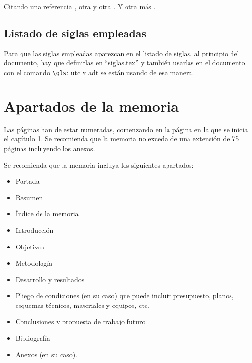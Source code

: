 Citando una referencia \cite{Smith1997}, otra \cite{Orfanidis1996} y otra \cite{Wyndrum1965}. Y otra más \cite{Dai2010}.

\section{Listado de siglas empleadas}

Para que las siglas empleadas aparezcan en el listado de siglas, al principio del documento, hay que definirlas en ``siglas.tex'' y también usarlas en el documento con el comando \verb+\gls+: \gls{utc} y \gls{adt} se están usando de esa manera.


\chapter{Apartados de la memoria}

Las páginas han de estar numeradas, comenzando en la página en la que se inicia el capítulo 1. Se recomienda que la memoria no exceda de una extensión de 75 páginas incluyendo los anexos.

Se recomienda que la memoria incluya los siguientes apartados:
\begin{itemize}
\item Portada
\item Resumen
\item Índice de la memoria
\item Introducción
\item Objetivos
\item Metodología
\item Desarrollo y resultados
\item Pliego de condiciones (en su caso) que puede incluir presupuesto, planos, esquemas técnicos, materiales y equipos, etc. 
\item Conclusiones y propuesta de trabajo futuro
\item Bibliografía
\item Anexos (en su caso).
\end{itemize}

